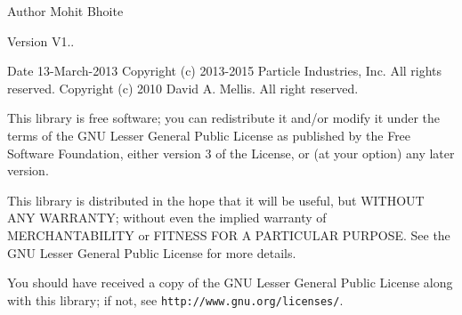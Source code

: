 \begin{DoxyAuthor}{Author}
Mohit Bhoite 
\end{DoxyAuthor}
\begin{DoxyVersion}{Version}
V1.. 
\end{DoxyVersion}
\begin{DoxyDate}{Date}
13-\/\+March-\/2013 Copyright (c) 2013-\/2015 Particle Industries, Inc. All rights reserved. Copyright (c) 2010 David A. Mellis. All right reserved.
\end{DoxyDate}
This library is free software; you can redistribute it and/or modify it under the terms of the G\+NU Lesser General Public License as published by the Free Software Foundation, either version 3 of the License, or (at your option) any later version.

This library is distributed in the hope that it will be useful, but W\+I\+T\+H\+O\+UT A\+NY W\+A\+R\+R\+A\+N\+TY; without even the implied warranty of M\+E\+R\+C\+H\+A\+N\+T\+A\+B\+I\+L\+I\+TY or F\+I\+T\+N\+E\+SS F\+OR A P\+A\+R\+T\+I\+C\+U\+L\+AR P\+U\+R\+P\+O\+SE. See the G\+NU Lesser General Public License for more details.

You should have received a copy of the G\+NU Lesser General Public License along with this library; if not, see {\tt http\+://www.\+gnu.\+org/licenses/}. 